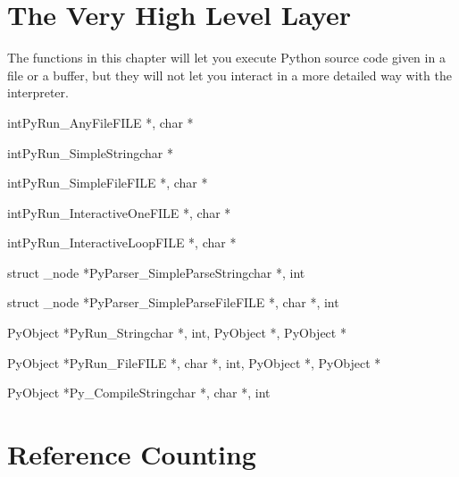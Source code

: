\documentclass[twoside,openright]{report}
\begin{document}
\chapter{The Very High Level Layer}

The functions in this chapter will let you execute Python source code
given in a file or a buffer, but they will not let you interact in a
more detailed way with the interpreter.

\begin{cfuncdesc}{int}{PyRun_AnyFile}{FILE *, char *}
\end{cfuncdesc}

\begin{cfuncdesc}{int}{PyRun_SimpleString}{char *}
\end{cfuncdesc}

\begin{cfuncdesc}{int}{PyRun_SimpleFile}{FILE *, char *}
\end{cfuncdesc}

\begin{cfuncdesc}{int}{PyRun_InteractiveOne}{FILE *, char *}
\end{cfuncdesc}

\begin{cfuncdesc}{int}{PyRun_InteractiveLoop}{FILE *, char *}
\end{cfuncdesc}

\begin{cfuncdesc}{struct _node *}{PyParser_SimpleParseString}{char *, int}
\end{cfuncdesc}

\begin{cfuncdesc}{struct _node *}{PyParser_SimpleParseFile}{FILE *, char *, int}
\end{cfuncdesc}

\begin{cfuncdesc}{PyObject *}{PyRun_String}{char *, int, PyObject *, PyObject *}
\end{cfuncdesc}

\begin{cfuncdesc}{PyObject *}{PyRun_File}{FILE *, char *, int, PyObject *, PyObject *}
\end{cfuncdesc}

\begin{cfuncdesc}{PyObject *}{Py_CompileString}{char *, char *, int}
\end{cfuncdesc}


\chapter{Reference Counting}
\end{document}
